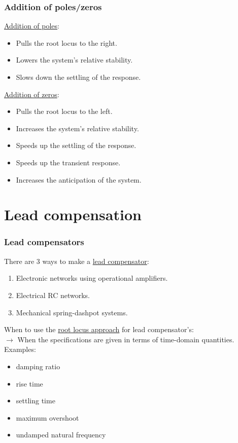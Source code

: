 \begin{frame}
	\frametitle{Addition of poles/zeros}
	\underline{Addition of poles}:\\
	\begin{itemize}
		\item Pulls the root locus to the right.
		\item Lowers the system's relative stability.
		\item Slows down the settling of the response.
	\end{itemize}
	\vspace{3mm}
	
	\underline{Addition of zeros}:
	\begin{itemize}
		\item Pulls the root locus to the left.
		\item Increases the system's relative stability.
		\item Speeds up the settling of the response.
		\item Speeds up the transient response.
		\item Increases the anticipation of the system. 
	\end{itemize}
\end{frame}

\section{Lead compensation}

\begin{frame}
	\frametitle{Lead compensators}
		There are 3 ways to make a \underline{lead compensator}:
		\begin{enumerate}
			\item Electronic networks using operational amplifiers.
			\item Electrical RC networks.
			\item Mechanical spring-dashpot systems.
		\end{enumerate}
		\vspace{3mm}
		
		When to use the \underline{root locus approach} for lead compensator's:\\
		$\rightarrow$ When the specifications are given in terms of time-domain quantities. Examples:
		\begin{itemize}
			\item damping ratio
			\item rise time
			\item settling time
			\item maximum overshoot
			\item undamped natural frequency
		\end{itemize}
\end{frame}

